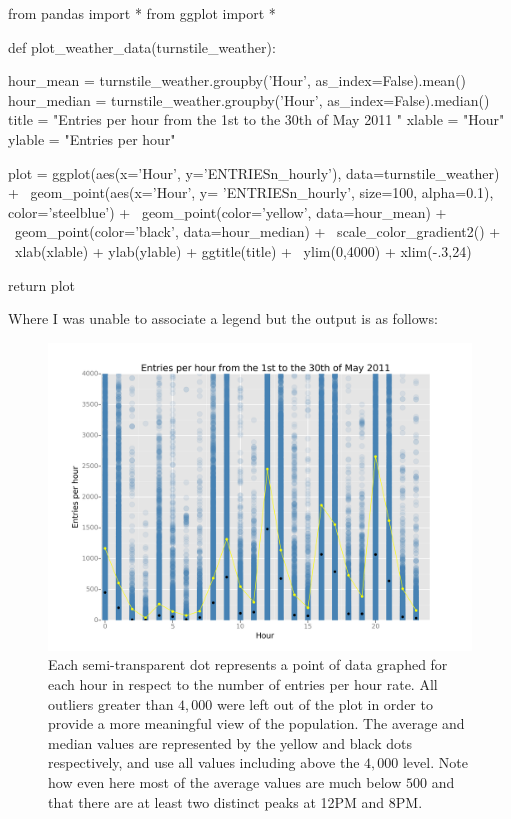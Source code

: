 \documentclass{article}
\numberwithin{questionCtr}{section}
\numberwithin{problemCtr}{section}
\begin{document}
\begin{python1}
from pandas import *
from ggplot import *

def plot_weather_data(turnstile_weather):
    
    hour_mean = turnstile_weather.groupby('Hour', as_index=False).mean()
    hour_median = turnstile_weather.groupby('Hour', as_index=False).median()
    title = "Entries per hour from the 1st to the 30th of May 2011 "
    xlable = "Hour"
    ylable = "Entries per hour"

    plot = ggplot(aes(x='Hour', y='ENTRIESn_hourly'), data=turnstile_weather) + \
    geom_point(aes(x='Hour', y= 'ENTRIESn_hourly', size=100, alpha=0.1), color='steelblue') + \
    geom_point(color='yellow', data=hour_mean) + \
    geom_point(color='black', data=hour_median) + \
    scale_color_gradient2() + \
    xlab(xlable) + ylab(ylable) + ggtitle(title) + \
    ylim(0,4000) + xlim(-.3,24)
    
    return plot
\end{python1}

Where I was unable to associate a legend but the output is as follows:

\begin{figure}[ht]
  \centering
  \includegraphics[width=\textwidth]{entries_per_hour.png}
  \caption{Each semi-transparent dot represents a point of data graphed for each
    hour in respect to the number of entries per hour rate.  All outliers
    greater than $4,000$  were left out of the plot in order to provide a more
    meaningful view of the population.  The average and median values are
    represented by the yellow and black dots respectively, and use all values
    including above the $4,000$ level.  Note how even here most of the average
    values are much below $500$ and that there are at least two distinct peaks
  at 12PM and 8PM.}
  \label{fig:bar-graph-ccs-vs-ics-times}
\end{figure}
\end{document}
